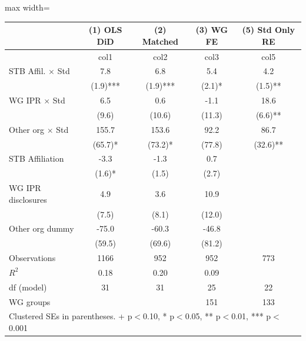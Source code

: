 \begin{adjustbox}{max width=\textwidth}
\begin{tabular}{lcccc}
\toprule
 & (1) OLS DiD & (2) Matched & (3) WG FE & (5) Std Only RE \\
\midrule
 & col1 & col2 & col3 & col5 \\
STB Affil. $\times$ Std & 7.8 & 6.8 & 5.4 & 4.2 \\
 & (1.9)*** & (1.9)*** & (2.1)* & (1.5)** \\
WG IPR $\times$ Std & 6.5 & 0.6 & -1.1 & 18.6 \\
 & (9.6) & (10.6) & (11.3) & (6.6)** \\
Other org $\times$ Std & 155.7 & 153.6 & 92.2 & 86.7 \\
 & (65.7)* & (73.2)* & (77.8) & (32.6)** \\
STB Affiliation & -3.3 & -1.3 & 0.7 &  \\
 & (1.6)* & (1.5) & (2.7) &  \\
WG IPR disclosures & 4.9 & 3.6 & 10.9 &  \\
 & (7.5) & (8.1) & (12.0) &  \\
Other org dummy & -75.0 & -60.3 & -46.8 &  \\
 & (59.5) & (69.6) & (81.2) &  \\
\midrule
Observations & 1166 & 952 & 952 & 773 \\
$R^2$ & 0.18 & 0.20 & 0.09 &  \\
df (model) & 31 & 31 & 25 & 22 \\
WG groups &  &  & 151 & 133 \\
\bottomrule
\multicolumn{5}{l}{\footnotesize Clustered SEs in parentheses. + p$<$0.10, * p$<$0.05, ** p$<$0.01, *** p$<$0.001} \\
\end{tabular}
\end{adjustbox}
